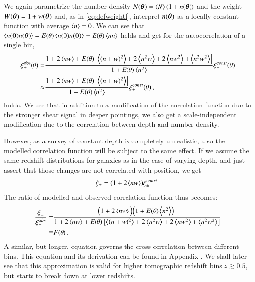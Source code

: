 We again parametrize the number density $N(\bm{\theta})=\left< N \right> (1+n(\bm{\theta}))$ and the weight $W(\bm{\theta})=1+w(\bm{\theta})$ and, as in \eqref{eq:defweightf}, interpret $n(\bm{\theta})$ as a locally constant function with average $\left< n \right> = 0$. We can see that $\left< n(\bm{0})n(\bm{\theta})\right> = E(\theta)\left< n(\bm{0})n(\bm{0})\right> \equiv E(\theta)\left< n n \right>$ holds and get for the autocorrelation of a single bin, 
 \begin{align}
\xi^{\text{obs}}_\pm(\theta) = & \frac{1 + 2\left< nw \right> + E(\theta)\left[\left< (n+w)^2\right> + 2 \left< n^2 w\right> + 2\left< nw^2\right> + \left< n^2 w^2\right> \right]}{1+E(\theta)\left< n^2\right> }\xi_\pm^{\mathrm const}(\theta) \\
\approx & \frac{1 + 2\left< nw \right> + E(\theta)\left[\left< (n+w)^2\right> \right]}{1+E(\theta)\left< n^2\right> }\xi_\pm^{\mathrm const}(\theta)\, , \nonumber
 \label{eq:ffunct}
\end{align}
holds. We see that in addition to a modification of the correlation function due to the stronger shear signal in deeper pointings, we also get a scale-independent modification due to the correlation between depth and number density.

However, as a survey of constant depth is completely unrealistic, also the modelled correlation function will be subject to the same effect. If we assume the same redshift-distributions for galaxies as in the case of varying depth, and just assert that those changes are not correlated with position, we get 
\begin{equation}
\xi_\pm = (1+2\left< nw\right>)\xi_\pm^{\mathrm const}\, .
\end{equation}
The ratio of modelled and observed correlation function thus becomes: \begin{align}
\frac{\xi_\pm}{\xi_\pm^{\mathrm obs}} = & \frac{\left(1+2\left< nw\right>\left)\left(1+E(\theta)\left< n^2\right>\right)\right.\right.}{1 + 2\left< nw \right> + E(\theta)\left[\left< (n+w)^2\right> + 2 \left< n^2 w\right> + 2\left< nw^2\right> + \left< n^2 w^2\right> \right]} \\
\equiv & F(\theta) \, .
\end{align}
A similar, but longer, equation governs the cross-correlation between different bins. This equation and its derivation can be found in Appendix .
We shall later see that this approximation is valid for higher tomographic redshift bins $z\gtrsim 0.5$, but starts to break down at lower redshifts. 
